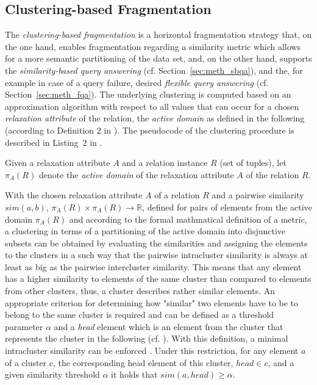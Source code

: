  
 
\subsection{Clustering-based Fragmentation}
\label{sec:meth_cbfr}

The \emph{clustering-based fragmentation} \citep{Wiese2014} is a horizontal fragmentation strategy that, on the one hand, enables fragmentation regarding 
a similarity metric which allows for a more semantic partitioning of the data set, and, on the other hand, supports the \emph{similarity-based query
answering} (cf. Section~\ref{sec:meth_sbqa}), and the, for example in case of a query failure, desired \emph{flexible query answering} 
(cf. Section~\ref{sec:meth_fqa}). The underlying clustering is computed based on an approximation algorithm \citep{Gonzales1985} with respect to all 
values that can occur for a chosen \emph{relaxation attribute} of the relation, the \emph{active domain} as defined in the following (according to
Definition 2 in \cite{Wiese2014}). The pseudocode of the clustering procedure is described in Listing~2 in \cite{Wiese2014}.

\begin{definition}
Given a relaxation attribute $A$ and a relation instance $R$ (set of tuples), let $\pi_A(R)$ denote the \emph{active domain} of the relaxation attribute
$A$ of the relation $R$.
\end{definition}

With the chosen relaxation attribute $A$ of a relation $R$ and a pairwise similarity $sim(a, b)$, $\pi_A(R) \times \pi_A(R) \to \mathbb{R}$, defined  
for pairs of elements from the active domain $\pi_A(R)$ and according to the formal mathmatical definition of a metric, a clustering in terms of a 
partitioning of the active domain into disjunctive subsets can be obtained by evaluating the similarities and assigning the elements to the clusters in
a such way that the pairwise intracluster similarity \citep{Gonzales1985} is always at least as big as the pairwise intercluster similarity. This means that
any element has a higher similarity to elements of the same cluster than compared to elements from other clusters, thus, a cluster describes rather similar
elements. An appropriate criterion for determining how "similar" two elements have to be to belong to the same cluster is required and can be defined as a
threshold parameter $\alpha$ and a \emph{head} element which is an element from the cluster that represents the cluster in the following (cf. \cite{Wiese2014}).
With this definition, a minimal intracluster similarity can be enforced \citep{Gonzales1985}. Under this restriction, for any element $a$ of a cluster $c$, the
corresponding head element of this cluster, $head \in c$, and a given similarity threshold $\alpha$ it holds that $sim(a,head) \geq \alpha$. 


